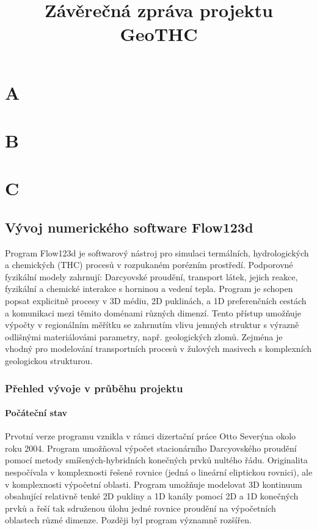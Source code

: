 \documentclass[11pt]{report}
\begin{document}

\title{Závěrečná zpráva projektu GeoTHC}
\maketitle
\chapter{A}
\chapter{B}
\chapter{C}

\pagebreak
\section{Vývoj numerického software Flow123d}
Program Flow123d je softwarový nástroj pro simulaci termálních, hydrologických 
a chemických (THC) procesů v rozpukaném porézním prostředí. Podporovné 
fyzikální modely zahrnují: Darcyovské proudění, transport látek, jejich reakce, 
fyzikální a chemické interakce s horninou a vedení tepla. Program je schopen 
popsat explicitně procesy v 3D médiu, 2D puklinách, a 1D preferenčních cestách a 
komunikaci mezi těmito doménami různých dimenzí. Tento přístup umožňuje výpočty 
v regionálním měřítku se zahrnutím vlivu jemných struktur s výrazně odlišnými 
materiálovámi parametry, např. geologických zlomů. Zejména je vhodný pro  
modelování transportních procesů v žulových masivech s komplexních geologickou 
strukturou.  

\subsection{Přehled vývoje v průběhu projektu}

\subsubsection{Počáteční stav}
Prvotní verze programu vznikla v rámci dizertační práce 
Otto Severýna okolo roku 2004. Program umožňoval výpočet stacionárního 
Darcyovského proudění pomocí metody smíšených-hybridních konečných prvků 
nultého řádu. Originalita nespočívala v komplexnosti řešené rovnice (jedná o 
lineární eliptickou rovnici), ale v komplexnosti výpočetní oblasti. Program 
umožňuje modelovat 3D kontinuum obsahující relativně tenké 2D pukliny a 1D 
kanály pomocí 2D a 1D konečných prvků a řeší tak sdruženou úlohu jedné rovnice 
proudění na výpočetních oblastech různé dimenze. Později byl program významně 
rozšířen.
\end{document}
